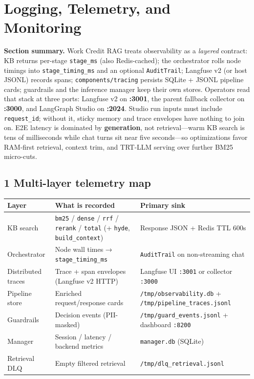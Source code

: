 \chapter{Logging, Telemetry, and Monitoring}\label{logging-telemetry-and-monitoring}

\textbf{Section summary.} Work Credit RAG treats observability as a \emph{layered} contract: KB returns per-stage \texttt{stage\_ms} (also Redis-cached); the orchestrator rolls node timings into \texttt{stage\_timing\_ms} and an optional \texttt{AuditTrail}; Langfuse v2 (or host JSONL) records spans; \texttt{components/tracing} persists SQLite + JSONL pipeline cards; guardrails and the inference manager keep their own stores. Operators read that stack at three ports: Langfuse v2 on \textbf{:3001}, the parent fallback collector on \textbf{:3000}, and LangGraph Studio on \textbf{:2024}. Studio run inputs must include \texttt{request\_id}; without it, sticky memory and trace envelopes have nothing to join on. E2E latency is dominated by \textbf{generation}, not retrieval---warm KB search is tens of milliseconds while chat turns sit near five seconds---so optimizations favor RAM-first retrieval, context trim, and TRT-LLM serving over further BM25 micro-cuts.

\section{1 Multi-layer telemetry map}\label{multi-layer-telemetry-map}

\begin{longtable}[]{@{}
  >{\raggedright\arraybackslash}p{}
  >{\raggedright\arraybackslash}p{}
  >{\raggedright\arraybackslash}p{}@{}}
\toprule\noalign{}
Layer & What is recorded & Primary sink \\
\midrule\noalign{}
\endhead
\bottomrule\noalign{}
\endlastfoot
KB search & \texttt{bm25} / \texttt{dense} / \texttt{rrf} / \texttt{rerank} / \texttt{total} (+ \texttt{hyde}, \texttt{build\_context}) & Response JSON + Redis TTL 600s \\
Orchestrator & Node wall times → \texttt{stage\_timing\_ms} & \texttt{AuditTrail} on non-streaming chat \\
Distributed traces & Trace + span envelopes (Langfuse v2 HTTP) & Langfuse UI \texttt{:3001} or collector \texttt{:3000} \\
Pipeline store & Enriched request/response cards & \texttt{/tmp/observability.db} + \texttt{/tmp/pipeline\_traces.jsonl} \\
Guardrails & Decision events (PII-masked) & \texttt{/tmp/guard\_events.jsonl} + dashboard \texttt{:8200} \\
Manager & Session / latency / backend metrics & \texttt{manager.db} (SQLite) \\
Retrieval DLQ & Empty filtered retrieval & \texttt{/tmp/dlq\_retrieval.jsonl} \\
\end{longtable}

